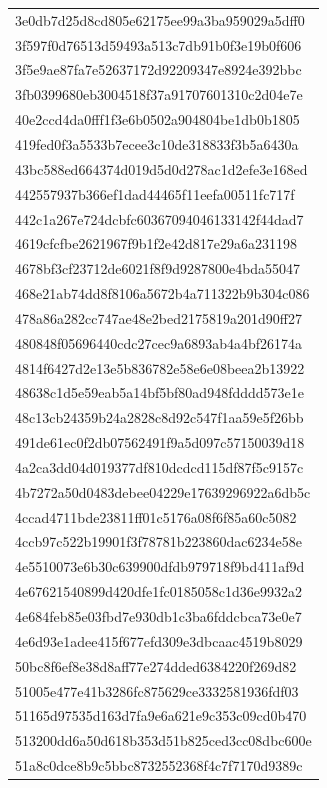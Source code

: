 \begin{tabular}{l}
3e0db7d25d8cd805e62175ee99a3ba959029a5dff0 \\
3f597f0d76513d59493a513c7db91b0f3e19b0f606 \\
3f5e9ae87fa7e52637172d92209347e8924e392bbc \\
3fb0399680eb3004518f37a91707601310c2d04e7e \\
40e2ccd4da0fff1f3e6b0502a904804be1db0b1805 \\
419fed0f3a5533b7ecee3c10de318833f3b5a6430a \\
43bc588ed664374d019d5d0d278ac1d2efe3e168ed \\
442557937b366ef1dad44465f11eefa00511fc717f \\
442c1a267e724dcbfc60367094046133142f44dad7 \\
4619cfcfbe2621967f9b1f2e42d817e29a6a231198 \\
4678bf3cf23712de6021f8f9d9287800e4bda55047 \\
468e21ab74dd8f8106a5672b4a711322b9b304c086 \\
478a86a282cc747ae48e2bed2175819a201d90ff27 \\
480848f05696440cdc27cec9a6893ab4a4bf26174a \\
4814f6427d2e13e5b836782e58e6e08beea2b13922 \\
48638c1d5e59eab5a14bf5bf80ad948fdddd573e1e \\
48c13cb24359b24a2828c8d92c547f1aa59e5f26bb \\
491de61ec0f2db07562491f9a5d097c57150039d18 \\
4a2ca3dd04d019377df810dcdcd115df87f5c9157c \\
4b7272a50d0483debee04229e17639296922a6db5c \\
4ccad4711bde23811ff01c5176a08f6f85a60c5082 \\
4ccb97c522b19901f3f78781b223860dac6234e58e \\
4e5510073e6b30c639900dfdb979718f9bd411af9d \\
4e67621540899d420dfe1fc0185058c1d36e9932a2 \\
4e684feb85e03fbd7e930db1c3ba6fddcbca73e0e7 \\
4e6d93e1adee415f677efd309e3dbcaac4519b8029 \\
50bc8f6ef8e38d8aff77e274dded6384220f269d82 \\
51005e477e41b3286fc875629ce3332581936fdf03 \\
51165d97535d163d7fa9e6a621e9c353c09cd0b470 \\
513200dd6a50d618b353d51b825ced3cc08dbc600e \\
51a8c0dce8b9c5bbc8732552368f4c7f7170d9389c \\

\end{tabular}
